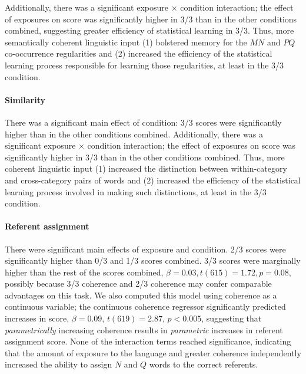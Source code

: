 \documentclass[man,floatsintext]{apa6}
\begin{document}
Additionally, there was a significant exposure $\times$ condition interaction; the effect of exposures on score was significantly higher in 3/3 than in the other conditions combined, suggesting greater efficiency of statistical learning in 3/3. Thus, more semantically coherent linguistic input (1) bolstered memory for the $MN$ and $PQ$ co-occurrence regularities and (2) increased the efficiency of the statistical learning process responsible for learning those regularities, at least in the 3/3 condition.

\paragraph{Similarity} There was a significant main effect of condition: 3/3 scores were significantly higher than in the other conditions combined. Additionally, there was a significant exposure $\times$ condition interaction; the effect of exposures on score was significantly higher in 3/3 than in the other conditions combined. Thus, more coherent linguistic input (1) increased the distinction between within-category and cross-category pairs of words and (2) increased the efficiency of the statistical learning process involved in making such distinctions, at least in the 3/3 condition.

\paragraph{Referent assignment}

There were significant main effects of exposure and condition. 2/3 scores were significantly higher than 0/3 and 1/3 scores combined. 3/3 scores were marginally higher than the rest of the scores combined, $\beta = 0.03, t(615) = 1.72, p = 0.08$, possibly because 3/3 coherence and 2/3 coherence may confer comparable advantages on this task. We also computed this model using coherence as a continuous variable; the continuous coherence regressor significantly predicted increases in score, $\beta = 0.09$, $t(619) = 2.87$, $p < 0.005$, suggesting that \emph{parametrically} increasing coherence results in \emph{parametric} increases in referent assignment score. None of the interaction terms reached significance, indicating that the amount of exposure to the language and greater coherence independently increased the ability to assign $N$ and $Q$ words to the correct referents.

\end{document}
